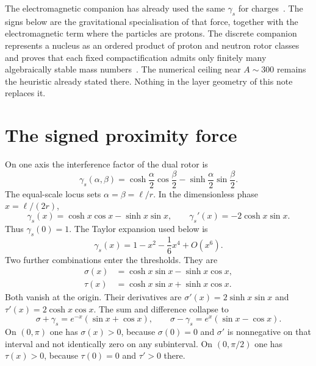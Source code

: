 \documentclass[a4paper]{article}
\begin{document}
The electromagnetic companion has already used the same \(\gamma_s\) for charges~\cite{dst-shell}. The signs below are the gravitational specialisation of that force, together with the electromagnetic term where the particles are protons. The discrete companion represents a nucleus as an ordered product of proton and neutron rotor classes and proves that each fixed compactification admits only finitely many algebraically stable mass numbers~\cite{dst-dio}. The numerical ceiling near \(A\sim 300\) remains the heuristic already stated there. Nothing in the layer geometry of this note replaces it.

\section{The signed proximity force}
\label{sec:force}

On one axis the interference factor of the dual rotor is
\begin{equation}
\label{eq:gamma-ab}
\gamma_s(\alpha,\beta)
  =\cosh\frac{\alpha}{2}\cos\frac{\beta}{2}
  -\sinh\frac{\alpha}{2}\sin\frac{\beta}{2}.
\end{equation}
The equal-scale locus sets \(\alpha=\beta=\ell/r\). In the dimensionless phase \(x=\ell/(2r)\),
\begin{equation}
\label{eq:gamma}
\gamma_s(x)=\cosh x\cos x-\sinh x\sin x,
\qquad
\gamma_s'(x)=-2\cosh x\sin x.
\end{equation}
Thus \(\gamma_s(0)=1\). The Taylor expansion used below is
\begin{equation}
\label{eq:series}
\gamma_s(x)=1-x^{2}-\frac16 x^{4}+O(x^{6}).
\end{equation}
Two further combinations enter the thresholds. They are
\begin{align}
\label{eq:sigma}
\sigma(x)&=\cosh x\sin x-\sinh x\cos x,\\
\label{eq:tau}
\tau(x)&=\cosh x\sin x+\sinh x\cos x.
\end{align}
Both vanish at the origin. Their derivatives are \(\sigma'(x)=2\sinh x\sin x\) and \(\tau'(x)=2\cosh x\cos x\). The sum and difference collapse to
\begin{equation}
\label{eq:sumdiff}
\sigma+\gamma_s=e^{-x}(\sin x+\cos x),
\qquad
\sigma-\gamma_s=e^{x}(\sin x-\cos x).
\end{equation}
On \((0,\pi)\) one has \(\sigma(x)>0\), because \(\sigma(0)=0\) and \(\sigma'\) is nonnegative on that interval and not identically zero on any subinterval. On \((0,\pi/2)\) one has \(\tau(x)>0\), because \(\tau(0)=0\) and \(\tau'>0\) there.
\end{document}
